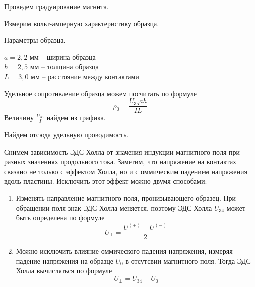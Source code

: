 



    \noindent Проведем градуирование магнита.
    

    \noindent Измерим вольт-амперную характеристику образца.
    

    \noindent Параметры образца.
    \begin{center}
        $a = 2,2$ мм -- ширина образца              \\
        $h = 2,5$ мм -- толщина образца             \\
        $L = 3,0$ мм -- расстояние между контактами \\
    \end{center}

    \noindent Удельное сопротивление образца можем посчитать по формуле
    \begin{equation*}
        \rho_0 = \frac{U_{35} a h}{I L}
    \end{equation*}
    \noindent Величину $\frac{U_{35}}{I}$ найдем из графика.

    \begin{center}
    \end{center}

    \noindent Найдем отсюда удельную проводимость.

    \begin{center}
    \end{center}

    \noindent Снимем зависимость ЭДС Холла от значения индукции магнитного поля при разных значениях продольного тока.
    Заметим, что напряжение на контактах связано не только с эффектом Холла, но и с 
    оммическим падением напряжения вдоль пластины. Исключить этот эффект можно двумя способами:

    \begin{enumerate}
        \item Изменять направление магнитного поля, пронизывающего образец. При обращении поля знак
        ЭДС Холла меняется, поэтому ЭДС Холла $U_{34}$ может быть определена по формуле
        \begin{equation*}
            U_{\bot} = \frac{U^{(+)} - U^{(-)}}{2}
        \end{equation*}
        \item Можно исключить влияние оммического падения напряжения, измеряя падение напряжения на образце $U_0$
        в отсутсвии магнитного поля. Тогда ЭДС Холла вычисляться по формуле
        \begin{equation*}
            U_{\bot} = U_{34} - U_0
        \end{equation*}
    \end{enumerate}

